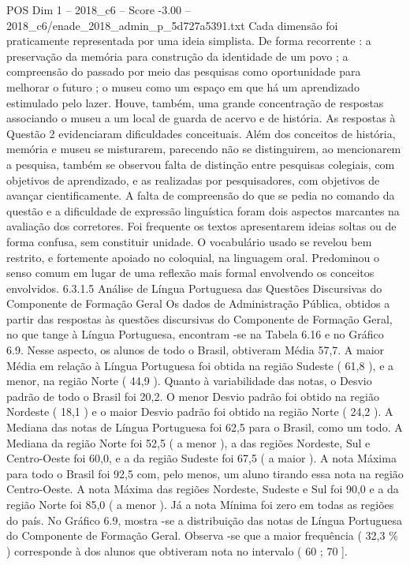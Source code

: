 \begin{textsample}{POS Dim 1 – 2018\_c6 – Score -3.00 – 2018\_c6/enade\_2018\_admin\_p\_5d727a5391.txt}
Cada dimensão foi praticamente representada por uma ideia simplista.
De forma recorrente : a preservação da memória para construção da identidade de um povo ; a compreensão do passado por meio das pesquisas como oportunidade para melhorar o futuro ; o museu como um espaço em que há um aprendizado estimulado pelo lazer.
Houve, também, uma grande concentração de respostas associando o museu a um local de guarda de acervo e de história.
As respostas à Questão 2 evidenciaram dificuldades conceituais.
Além dos conceitos de história, memória e museu se misturarem, parecendo não se distinguirem, ao mencionarem a pesquisa, também se observou falta de distinção entre pesquisas colegiais, com objetivos de aprendizado, e as realizadas por pesquisadores, com objetivos de avançar cientificamente.
A falta de compreensão do que se pedia no comando da questão e a dificuldade de expressão linguística foram dois aspectos marcantes na avaliação dos corretores.
Foi frequente os textos apresentarem ideias soltas ou de forma confusa, sem constituir unidade.
O vocabulário usado se revelou bem restrito, e fortemente apoiado no coloquial, na linguagem oral.
Predominou o senso comum em lugar de uma reflexão mais formal envolvendo os conceitos envolvidos. 6.3.1.5 Análise de Língua Portuguesa das Questões Discursivas do Componente de Formação Geral Os dados de Administração Pública, obtidos a partir das respostas às questões discursivas do Componente de Formação Geral, no que tange à Língua Portuguesa, encontram -se na Tabela 6.16 e no Gráfico 6.9.
Nesse aspecto, os alunos de todo o Brasil, obtiveram Média 57,7.
A maior Média em relação à Língua Portuguesa foi obtida na região Sudeste ( 61,8 ), e a menor, na região Norte ( 44,9 ).
Quanto à variabilidade das notas, o Desvio padrão de todo o Brasil foi 20,2.
O menor Desvio padrão foi obtido na região Nordeste ( 18,1 ) e o maior Desvio padrão foi obtido na região Norte ( 24,2 ).
A Mediana das notas de Língua Portuguesa foi 62,5 para o Brasil, como um todo.
A Mediana da região Norte foi 52,5 ( a menor ), a das regiões Nordeste, Sul e Centro-Oeste foi 60,0, e a da região Sudeste foi 67,5 ( a maior ).
A nota Máxima para todo o Brasil foi 92,5 com, pelo menos, um aluno tirando essa nota na região Centro-Oeste.
A nota Máxima das regiões Nordeste, Sudeste e Sul foi 90,0 e a da região Norte foi 85,0 ( a menor ).
Já a nota Mínima foi zero em todas as regiões do país.
No Gráfico 6.9, mostra -se a distribuição das notas de Língua Portuguesa do Componente de Formação Geral.
Observa -se que a maior frequência ( 32,3 \% ) corresponde à dos alunos que obtiveram nota no intervalo ( 60 ; 70 ].

\end{textsample}

